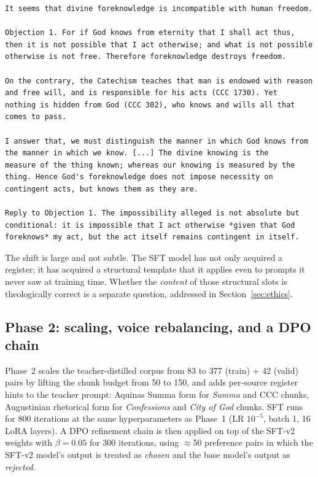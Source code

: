 \begin{lstlisting}[caption={SFT (Qwen 2.5\,7B-Instruct + LoRA, our adapter)},
                    label=lst:sft,frame=single]
It seems that divine foreknowledge is incompatible with human freedom.

Objection 1. For if God knows from eternity that I shall act thus,
then it is not possible that I act otherwise; and what is not possible
otherwise is not free. Therefore foreknowledge destroys freedom.

On the contrary, the Catechism teaches that man is endowed with reason
and free will, and is responsible for his acts (CCC 1730). Yet
nothing is hidden from God (CCC 302), who knows and wills all that
comes to pass.

I answer that, we must distinguish the manner in which God knows from
the manner in which we know. [...] The divine knowing is the
measure of the thing known; whereas our knowing is measured by the
thing. Hence God's foreknowledge does not impose necessity on
contingent acts, but knows them as they are.

Reply to Objection 1. The impossibility alleged is not absolute but
conditional: it is impossible that I act otherwise *given that God
foreknows* my act, but the act itself remains contingent in itself.
\end{lstlisting}

The shift is large and not subtle. The SFT model has not only acquired
a register; it has acquired a structural template that it applies even to
prompts it never saw at training time. Whether the \emph{content} of
those structural slots is theologically correct is a separate question,
addressed in Section~\ref{sec:ethics}.

\subsection{Phase 2: scaling, voice rebalancing, and a DPO chain}
\label{sec:phase2}

Phase~2 scales the teacher-distilled corpus from 83 to 377 (train) +
42 (valid) pairs by lifting the chunk budget from 50 to 150, and adds
per-source register hints to the teacher prompt: Aquinas Summa form for
\emph{Summa} and CCC chunks, Augustinian rhetorical form for
\emph{Confessions} and \emph{City of God} chunks. SFT runs for 800
iterations at the same hyperparameters as Phase~1 (LR $10^{-5}$, batch
1, 16 LoRA layers). A DPO refinement chain is then applied on top of
the SFT-v2 weights with $\beta=0.05$ for 300 iterations, using
$\approx$50 preference pairs in which the SFT-v2 model's output is
treated as \emph{chosen} and the base model's output as
\emph{rejected}.

